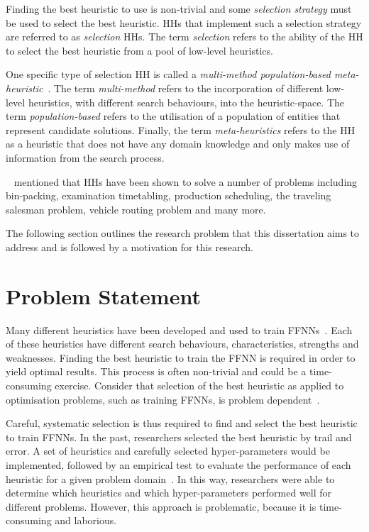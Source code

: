 Finding the best heuristic to use is non-trivial and some \textit{selection strategy} must be used to select the best heuristic. \acp{HH} that implement such a selection strategy are referred to as \textit{selection} \acp{HH}. The term \textit{selection} refers to the ability of the \acs{HH} to select the best heuristic from a pool of low-level heuristics.

One specific type of selection \acs{HH} is called a \textit{multi-method population-based meta-heuristic}~\cite{ref:vanderstockt:2018}. The term \textit{multi-method} refers to the incorporation of different low-level heuristics, with different search behaviours, into the heuristic-space. The term \textit{population-based} refers to the utilisation of a population of entities that represent candidate solutions. Finally, the term \textit{meta-heuristics} refers to the \acs{HH} as a heuristic that does not have any domain knowledge and only makes use of information from the search process.

\citeauthor{ref:grobler:2015}~\cite{ref:grobler:2015} mentioned that \acp{HH} have been shown to solve a number of problems including bin-packing, examination timetabling, production scheduling, the traveling salesman problem, vehicle routing problem and many more.

The following section outlines the research problem that this dissertation aims to address and is followed by a motivation for this research.


\section{Problem Statement}\label{sec:introduction:problem}

Many different heuristics have been developed and used to train \acp{FFNN}~\cite{ref:gudise:2003, ref:rakitianskaia:2012, ref:montana:1989}. Each of these heuristics have different search behaviours, characteristics, strengths and weaknesses. Finding the best heuristic to train the \acs{FFNN} is required in order to yield optimal results. This process is often non-trivial and could be a time-consuming exercise.  Consider that selection of the best heuristic as applied to optimisation problems, such as training \acp{FFNN}, is problem dependent~\cite{ref:allen:1996, ref:drake:2020, ref:pillay:2018}.

Careful, systematic selection is thus required to find and select the best heuristic to train \acp{FFNN}. In the past, researchers selected the best heuristic by trail and error. A set of heuristics and carefully selected hyper-parameters would be implemented, followed by an empirical test to evaluate the performance of each heuristic for a given problem domain~\cite{ref:pillay:2015}. In this way, researchers were able to determine which heuristics and which hyper-parameters performed well for different problems. However, this approach is problematic, because it is time-consuming and laborious.

